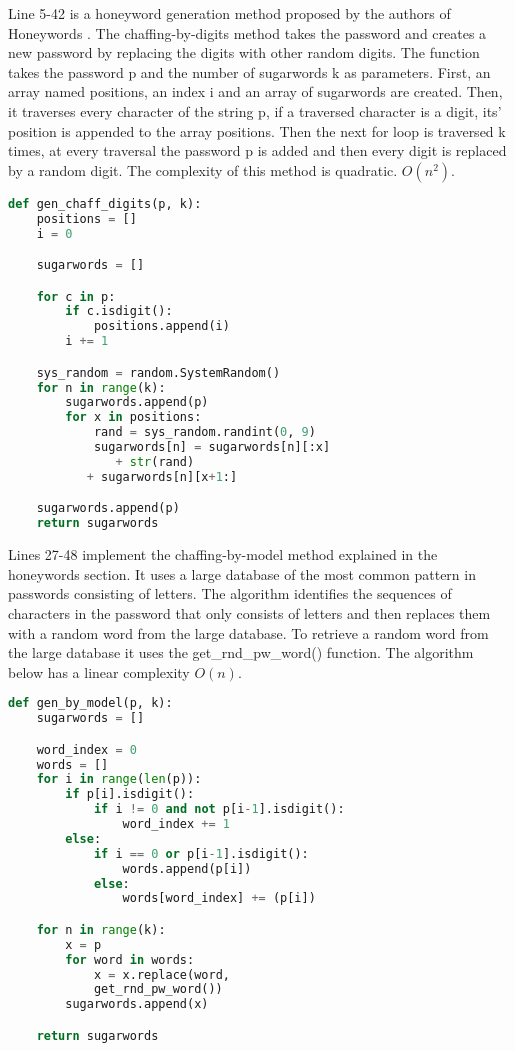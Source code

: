 \documentclass[../main.tex]{subfiles}
\begin{document}
Line 5-42 is a honeyword generation method proposed by the authors of
Honeywords \cite{juels2013honeywords}. The chaffing-by-digits method 
takes the password and creates a new password by replacing the digits with other
random digits. The function takes the password p and the number of sugarwords k
as parameters. First, an array named positions, an index i and an array
of sugarwords are created. Then, it traverses every character of the string p, if a
traversed character is a digit, its' position is appended to the array
positions. Then the next for loop is traversed k times, at every traversal the
password p is added and then every digit is replaced by a random digit. The complexity
of this method is quadratic. \(O(n^2)\).

\begin{lstlisting}[language=Python]
def gen_chaff_digits(p, k):
    positions = []
    i = 0

    sugarwords = []

    for c in p:
        if c.isdigit():
            positions.append(i)
        i += 1

    sys_random = random.SystemRandom()
    for n in range(k):
        sugarwords.append(p)
        for x in positions:
            rand = sys_random.randint(0, 9)
            sugarwords[n] = sugarwords[n][:x] 
	    	   + str(rand) 
		   + sugarwords[n][x+1:]

    sugarwords.append(p)
    return sugarwords
\end{lstlisting}

Lines 27-48 implement the chaffing-by-model method explained in the honeywords
section. It uses a large database of the most common pattern in passwords
consisting of letters. The algorithm identifies the sequences of characters in the
password that only consists of letters and then replaces them with a random word
from the large database. To retrieve a random word from the large database it uses
the get\_rnd\_pw\_word() function. The algorithm below has a linear complexity
\(O(n)\).

\begin{lstlisting}[language=Python]
def gen_by_model(p, k):
    sugarwords = []

    word_index = 0
    words = []
    for i in range(len(p)):
        if p[i].isdigit():
            if i != 0 and not p[i-1].isdigit():
                word_index += 1
        else:
            if i == 0 or p[i-1].isdigit():
                words.append(p[i])
            else:
                words[word_index] += (p[i])

    for n in range(k):
        x = p
        for word in words:
            x = x.replace(word, 
	    	get_rnd_pw_word())
        sugarwords.append(x)

    return sugarwords
\end{lstlisting}
\end{document}
